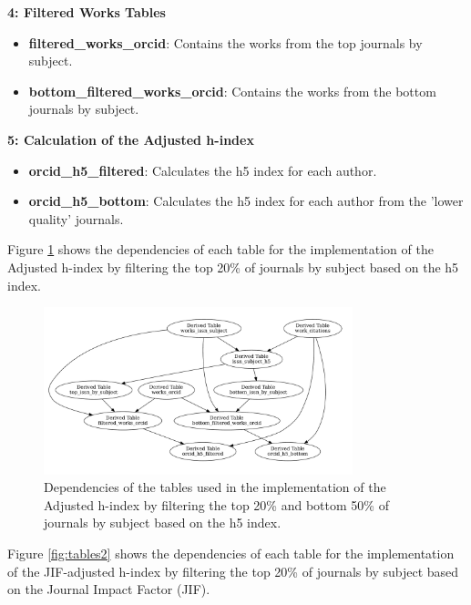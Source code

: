 \noindent\textbf{4: Filtered Works Tables}
\begin{itemize}
      \item \textbf{filtered\_works\_orcid}: Contains the works from the top journals by subject.
      \item \textbf{bottom\_filtered\_works\_orcid}: Contains the works from the bottom journals by subject.
\end{itemize}

\noindent\textbf{5: Calculation of the Adjusted h-index}
\begin{itemize}
      \item \textbf{orcid\_h5\_filtered}: Calculates the h5 index for each author.
      \item \textbf{orcid\_h5\_bottom}: Calculates the h5 index for each author from the 'lower quality' journals.
\end{itemize}

Figure \ref{fig:tables} shows the dependencies of each table for the
implementation of the Adjusted h-index by filtering the top 20\% of journals by
subject based on the h5 index.

\begin{figure}[H]
      \centering
      \includegraphics[width=0.8\textwidth]{../figs/h5.pdf}
      \caption{Dependencies of the tables used in the implementation of the Adjusted h-index by filtering the top 20\% and bottom 50\% of journals by subject based on the h5 index.}
      \label{fig:tables}
\end{figure}

Figure \ref{fig:tables2} shows the dependencies of each table for the
implementation of the JIF-adjusted h-index by filtering the top 20\% of
journals by subject based on the Journal Impact Factor (JIF).

